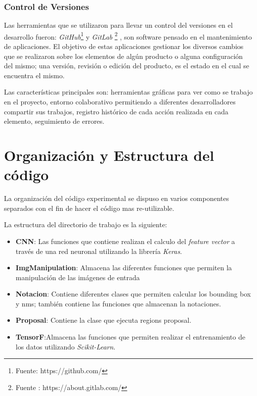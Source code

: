 \subsubsection*{Control de Versiones}

Las herramientas que se utilizaron para llevar un control del versiones en el desarrollo fueron: \textit{GitHub}\footnote{Fuente: https://github.com/} y \textit{GitLab} \footnote{Fuente : https://about.gitlab.com/} , son software pensado en el mantenimiento de aplicaciones. El objetivo de estas aplicaciones gestionar los diversos cambios que se realizaron sobre los elementos de algún producto o alguna configuración del mismo; una versión, revisión o edición del producto, es el estado en el cual se encuentra el mismo.

Las características principales son: herramientas gráficas para ver como se trabajo en el proyecto, entorno colaborativo permitiendo a diferentes desarrolladores compartir sus trabajos, registro histórico de cada acción realizada en cada elemento, seguimiento de errores.

\section*{Organización y Estructura del código}\label{sec:estructuracodigo}

La organización del código experimental se dispuso en varios componentes separados con el fin de hacer el código mas re-utilizable.

La estructura del directorio de trabajo es la siguiente:
\begin{itemize}
 \item \textbf{CNN}: Las funciones que contiene realizan el calculo del \textit{feature vector} a través de una red neuronal utilizando la librería 
\textit{Keras}.
 \item \textbf{ImgManipulation}: Almacena las diferentes funciones que permiten la manipulación de las imágenes de entrada 
 \item \textbf{Notacion}: Contiene diferentes clases que permiten calcular los bounding box y \ac{nms}; también contiene las funciones que almacenan 
la notaciones.
 \item \textbf{Proposal}: Contiene la clase que ejecuta regions proposal.
 \item \textbf{TensorF}:Almacena las funciones que permiten realizar el entrenamiento de los datos utilizando \textit{Scikit-Learn}.
\end{itemize}

